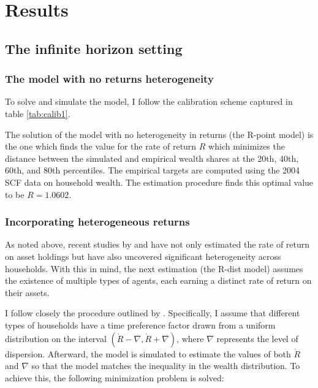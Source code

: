 \onlyinsubfile{\setcounter{section}{3}}
\section{Results}\notinsubfile{\label{sec:results}}

\subsection{The infinite horizon setting}
\subsubsection{The model with no returns heterogeneity}

\par To solve and simulate the model, I follow the calibration scheme captured in table \ref{tab:calib1}.
\unskip

\par The solution of the model with no heterogeneity in returns (the R-point model) is the one which finds the value for the rate of return $R$ which minimizes the distance between the simulated and empirical wealth shares at the 20th, 40th, 60th, and 80th percentiles. The empirical targets are computed using the 2004 SCF data on household wealth. The estimation procedure finds this optimal value to be $R = 1.0602$.

\subsubsection{Incorporating heterogeneous returns}

\par As noted above, recent studies by \cite{aflgdmlp20} and \cite{lblcps18} have not only estimated the rate of return on asset holdings but have also uncovered significant heterogeneity across households. With this in mind, the next estimation (the R-dist model) assumes the existence of multiple types of agents, each earning a distinct rate of return on their assets.

\par I follow closely the procedure outlined by \cite{cstw2017}. Specifically, I assume that different types of households have a time preference factor drawn from a uniform distribution on the interval $(\grave{R} - \nabla, \grave{R} + \nabla)$, where $\nabla$ represents the level of dispersion. Afterward, the model is simulated to estimate the values of both $\grave{R}$ and $\nabla$ so that the model matches the inequality in the wealth distribution. To achieve this, the following minimization problem is solved:

